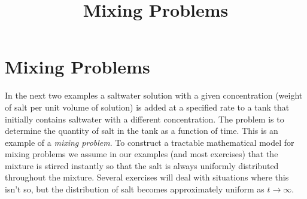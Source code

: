 \documentclass{ximera}
\title{Mixing Problems}
\begin{document}
\begin{abstract}

\end{abstract}

\maketitle



\section*{Mixing Problems}

In the next two examples a saltwater solution with a given
concentration (weight of salt per unit volume of solution) is added at
a specified rate to a tank that initially contains saltwater with a
different concentration. The problem is to determine the quantity of
salt in the tank as a function of time. This is an example of a \textit{
mixing problem}. To construct a tractable mathematical model for
mixing problems we assume in our examples (and most exercises) that
the mixture is stirred instantly so that the salt is always uniformly
distributed throughout the mixture. Several exercises will deal with situations where this isn't  so, but
the distribution of salt becomes approximately uniform as
$t\to\infty$.
\end{document}
